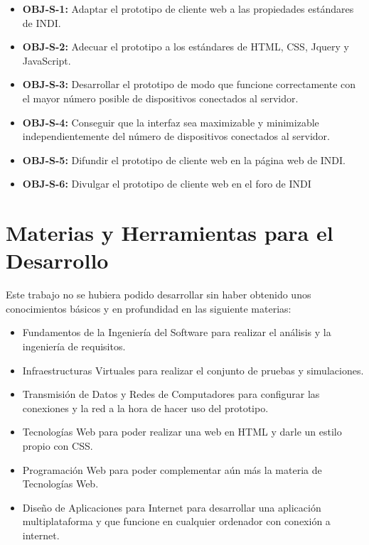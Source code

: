 \begin{itemize}
  \item \textbf{OBJ-S-1:} Adaptar el prototipo de cliente web a las propiedades estándares de INDI.
  \item \textbf{OBJ-S-2:} Adecuar el prototipo a los estándares de HTML, CSS, Jquery y JavaScript.
  \item \textbf{OBJ-S-3:} Desarrollar el prototipo de modo que funcione correctamente con el mayor número posible de dispositivos conectados al servidor.
  \item \textbf{OBJ-S-4:} Conseguir que la interfaz sea maximizable y minimizable independientemente del número de dispositivos conectados al servidor.
  \item \textbf{OBJ-S-5:} Difundir el prototipo de cliente web en la página web de INDI.
  \item \textbf{OBJ-S-6:} Divulgar el prototipo de cliente web en el foro de INDI
\end{itemize}


\section{Materias y Herramientas para el Desarrollo}
Este trabajo no se hubiera podido desarrollar sin haber obtenido unos conocimientos básicos y en profundidad en las siguiente materias:
\begin{itemize}
  \item Fundamentos de la Ingeniería del Software para realizar el análisis y la ingeniería de requisitos.
  \item Infraestructuras Virtuales para realizar el conjunto de pruebas y simulaciones.
  \item Transmisión de Datos y Redes de Computadores para configurar las conexiones y la red a la hora de hacer uso del prototipo.
  \item Tecnologías Web para poder realizar una web en HTML y darle un estilo propio con CSS.
  \item Programación Web para poder complementar aún más la materia de Tecnologías Web.
  \item Diseño de Aplicaciones para Internet para desarrollar una aplicación multiplataforma y que funcione en cualquier ordenador con conexión a internet.
\end{itemize}

